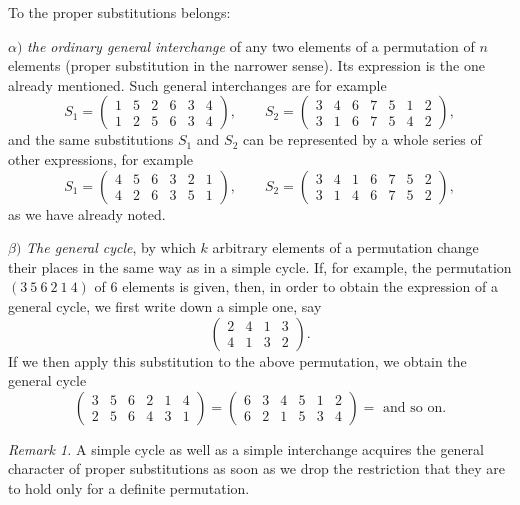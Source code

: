 \documentclass[10pt]{article}
\begin{document}
To the proper substitutions belongs:

\(\alpha)\) \emph{the ordinary general interchange} of any two elements of a permutation of \(n\) elements (proper substitution in the narrower sense). Its expression is the one already mentioned. Such general interchanges are for example
\[
S_1=\begin{pmatrix}1&5&2&6&3&4\\1&2&5&6&3&4\end{pmatrix},\qquad
S_2=\begin{pmatrix}3&4&6&7&5&1&2\\3&1&6&7&5&4&2\end{pmatrix},
\]
and the same substitutions \(S_1\) and \(S_2\) can be represented by a whole series of other expressions, for example
\[
S_1=\begin{pmatrix}4&5&6&3&2&1\\4&2&6&3&5&1\end{pmatrix},\qquad
S_2=\begin{pmatrix}3&4&1&6&7&5&2\\3&1&4&6&7&5&2\end{pmatrix},
\]
as we have already noted.

\(\beta)\) \emph{The general cycle}, by which \(k\) arbitrary elements of a permutation change their places in the same way as in a simple cycle. If, for example, the permutation \((3\ 5\ 6\ 2\ 1\ 4)\) of 6 elements is given, then, in order to obtain the expression of a general cycle, we first write down a simple one, say
\[
\begin{pmatrix}2&4&1&3\\4&1&3&2\end{pmatrix}.
\]
If we then apply this substitution to the above permutation, we obtain the general cycle
\[
\begin{pmatrix}3&5&6&2&1&4\\2&5&6&4&3&1\end{pmatrix}
=
\begin{pmatrix}6&3&4&5&1&2\\6&2&1&5&3&4\end{pmatrix}
=\text{ and so on.}
\]

\emph{Remark 1.} A simple cycle as well as a simple interchange acquires the general character of proper substitutions as soon as we drop the restriction that they are to hold only for a definite permutation.
\end{document}
